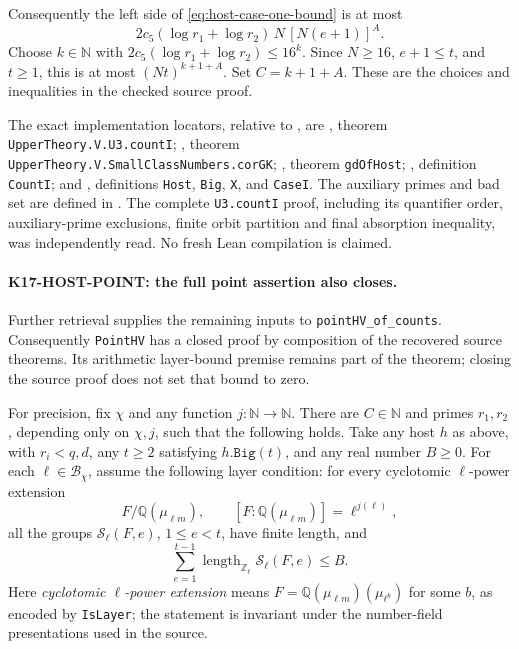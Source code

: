 Consequently the left side of \eqref{eq:host-case-one-bound} is at most
\[
 2c_5(\log r_1+\log r_2)\,N\,[N(e+1)]^A.
\]
Choose \(k\in\mathbb N\) with
\(2c_5(\log r_1+\log r_2)\le16^k\).
Since \(N\ge16\), \(e+1\le t\), and \(t\ge1\), this is at most
\((Nt)^{k+1+A}\).  Set \(C=k+1+A\).
These are the choices and inequalities in the checked source proof.

The exact implementation locators, relative to
, are
, theorem
\texttt{UpperTheory.V.U3.countI};
, theorem
\texttt{UpperTheory.V.SmallClassNumbers.corGK};
, theorem \texttt{gdOfHost};
, definition \texttt{CountI};
and ,
definitions \texttt{Host}, \texttt{Big}, \texttt{X}, and \texttt{CaseI}.
The auxiliary primes and bad set are defined in .
The complete \texttt{U3.countI} proof, including its quantifier order,
auxiliary-prime exclusions, finite orbit partition and final absorption
inequality, was independently read.  No fresh Lean compilation is
claimed.

\paragraph{K17-HOST-POINT: the full point assertion also closes.}
Further retrieval supplies the remaining inputs to
\texttt{pointHV\_of\_counts}.  Consequently \texttt{PointHV} has a
closed proof by composition of the recovered source theorems.  Its
arithmetic layer-bound premise remains part of the theorem; closing
the source proof does not set that bound to zero.

For precision, fix \(\chi\) and any function
\(j:\mathbb N\longrightarrow\mathbb N\).  There are
\(C\in\mathbb N\) and primes \(r_1,r_2\), depending only on
\(\chi,j\), such that the following holds.  Take any host \(h\) as
above, with \(r_i<q,d\), any \(t\ge2\) satisfying
\(h.\texttt{Big}(t)\), and any real number \(B\ge0\).
For each \(\ell\in\mathcal B_\chi\), assume the following layer
condition: for every cyclotomic \(\ell\)-power extension
\[
 F/\mathbb Q(\mu_{\ell m}),\qquad
 [F:\mathbb Q(\mu_{\ell m})]=\ell^{j(\ell)},
\]
all the groups \(\mathcal S_\ell(F,e)\), \(1\le e<t\), have finite
length, and
\begin{equation}\label{eq:host-layer-premise}
 \sum_{e=1}^{t-1}\operatorname{length}_{\mathbb Z_\ell}
                 \mathcal S_\ell(F,e)\le B.
\end{equation}
Here \emph{cyclotomic \(\ell\)-power extension} means
\(F=\mathbb Q(\mu_{\ell m})(\mu_{\ell^b})\) for some \(b\), as
encoded by \texttt{IsLayer}; the statement is invariant under the
number-field presentations used in the source.

